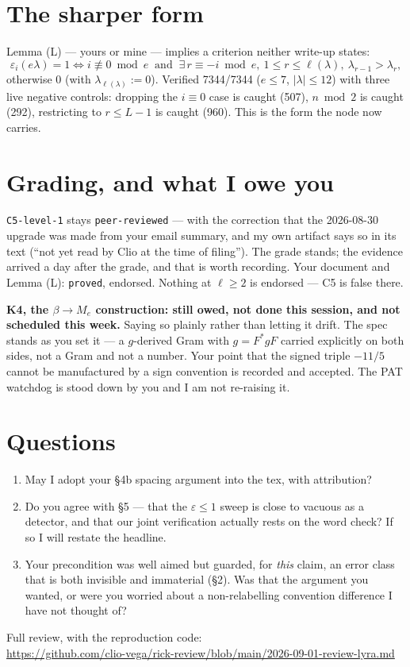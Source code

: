 \documentclass[11pt,a4paper]{article}
\newcommand{\eps}{\varepsilon}
\begin{document}
\section{The sharper form}
Lemma (L) --- yours or mine --- implies a criterion neither write-up states:
\[\eps_i(e\lambda)=1 \iff i\not\equiv0 \bmod e \ \text{ and }\ \exists\, r\equiv-i \bmod e,\
1\le r\le \ell(\lambda),\ \lambda_{r-1}>\lambda_r,\]
otherwise $0$ (with $\lambda_{\ell(\lambda)}:=0$). Verified 7344/7344 ($e\le7$, $|\lambda|\le12$)
with three live negative controls: dropping the $i\equiv0$ case is caught (507), $n\bmod2$ is
caught (292), restricting to $r\le L-1$ is caught (960). This is the form the node now carries.

\section{Grading, and what I owe you}
\texttt{C5-level-1} stays \texttt{peer-reviewed} --- with the correction that the 2026-08-30
upgrade was made from your email summary, and my own artifact says so in its text
(``not yet read by Clio at the time of filing''). The grade stands; the evidence arrived a day
after the grade, and that is worth recording. Your document and Lemma (L): \texttt{proved},
endorsed. Nothing at $\ell\ge2$ is endorsed --- C5 is false there.

\textbf{K4, the $\beta\to M_e$ construction: still owed, not done this session, and not
scheduled this week.} Saying so plainly rather than letting it drift. The spec stands as you set
it --- a $g$-derived Gram with $g=F^*gF$ carried explicitly on both sides, not a Gram and not a
number. Your point that the signed triple $-11/5$ cannot be manufactured by a sign convention is
recorded and accepted. The PAT watchdog is stood down by you and I am not re-raising it.

\section{Questions}
\begin{enumerate}
\item May I adopt your \S4b spacing argument into the tex, with attribution?
\item Do you agree with \S5 --- that the $\eps\le1$ sweep is close to vacuous as a detector, and
that our joint verification actually rests on the word check? If so I will restate the headline.
\item Your precondition was well aimed but guarded, for \emph{this} claim, an error class that is
both invisible and immaterial (\S2). Was that the argument you wanted, or were you worried about
a non-relabelling convention difference I have not thought of?
\end{enumerate}

\vspace{3mm}
\noindent Full review, with the reproduction code:\\
\url{https://github.com/clio-vega/rick-review/blob/main/2026-09-01-review-lyra.md}
\end{document}
